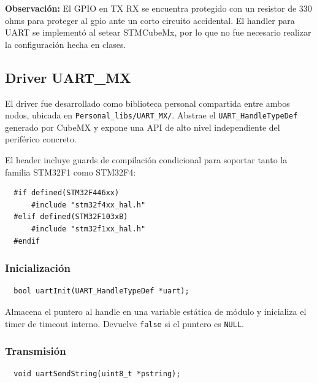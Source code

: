 \documentclass[12pt,a4paper]{article}
\begin{document}
  \textbf{Observación: }El GPIO en TX RX se encuentra protegido con un resistor de 330 ohms para proteger al gpio ante un corto circuito accidental. El handler para UART se implementó al setear STMCubeMx, por lo que no fue necesario realizar la configuración hecha en clases.
                                                                                
  \subsection{Driver UART\_MX}

  El driver fue desarrollado como biblioteca personal compartida entre ambos    
  nodos, ubicada en \texttt{Personal\_libs/UART\_MX/}. Abstrae el
  \texttt{UART\_HandleTypeDef} generado por CubeMX y expone una API de alto     
  nivel independiente del periférico concreto.

  El header incluye guards de compilación condicional para soportar tanto la    
  familia STM32F1 como STM32F4:
                                                                                
  \begin{verbatim}
  #if defined(STM32F446xx)
      #include "stm32f4xx_hal.h"
  #elif defined(STM32F103xB)
      #include "stm32f1xx_hal.h"
  #endif
  \end{verbatim}

  \subsubsection{Inicialización}                                                
  
  \begin{verbatim}                                                              
  bool uartInit(UART_HandleTypeDef *uart);
  \end{verbatim}

  Almacena el puntero al handle en una variable estática de módulo y inicializa 
  el timer de timeout interno. Devuelve \texttt{false} si el puntero es
  \texttt{NULL}.                                                                

  \subsubsection{Transmisión}

  \begin{verbatim}
  void uartSendString(uint8_t *pstring);
  \end{verbatim}                                                                
  
\end{document}
